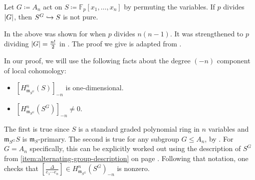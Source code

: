 \documentclass[12pt]{article}
\begin{document}
\begin{thm} \label{thm:An-modular-not-pure}
	Let $G \coloneqq A_{n}$ act on $S \coloneqq \mathbb{F}_{p}[x_{1}, \ldots, x_{n}]$ by permuting the variables. If $p$ divides ${\left\lvert G \right\lvert}$, then $S^{G} \hookrightarrow S$ is not pure.
\end{thm}
In \cite{GlassbrennerThesis} the above was shown for when $p$ divides $n(n-1)$. It was strengthened to $p$ dividing ${\left\lvert G \right\lvert} = \frac{n!}{2}$ in \cite{SinghFailureFpurityFregularityInvariants}. The proof we give is adapted from \cite{GoelJeffriesSingh}.
\begin{rem}
	In our proof, we will use the following facts about the degree $(-n)$ component of local cohomology:
	\begin{itemize}
		\item $\left[H_{\mathfrak{m}_{S^{G}}}^{n}(S)\right]_{-n}$ is one-dimensional.
		\item $\left[H_{\mathfrak{m}_{S^{G}}}^{n}(S^{G})\right]_{-n} \neq 0$.
	\end{itemize}
	The first is true since $S$ is a standard graded polynomial ring in $n$ variables and $\mathfrak{m}_{S^{G}}S$ is $\mathfrak{m}_{S}$-primary. \newline
	The second is true for any subgroup $G \le A_{n}$, by \cite[Theorem 4.4]{GoelJeffriesSingh}. \newline
	For $G = A_{n}$ specifically, this can be explicitly worked out using the description of $S^{G}$ from \ref{item:alternating-group-description} on page \pageref{item:alternating-group-description}. Following that notation, one checks that $\left[\frac{\Delta}{e_{1} \cdots e_{n}}\right] \in H_{\mathfrak{m}_{S^{G}}}^{n}(S^{G})_{-n}$ is nonzero.
\end{rem}
\end{document}
